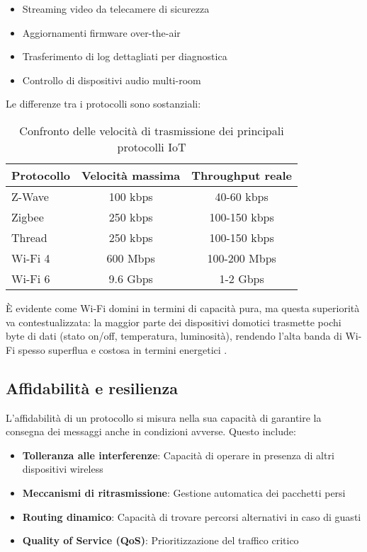 \begin{itemize}
    \item Streaming video da telecamere di sicurezza
    \item Aggiornamenti firmware over-the-air
    \item Trasferimento di log dettagliati per diagnostica
    \item Controllo di dispositivi audio multi-room
\end{itemize}

Le differenze tra i protocolli sono sostanziali:

\begin{table}[h]
\centering
\begin{tabular}{|l|c|c|}
\hline
\textbf{Protocollo} & \textbf{Velocità massima} & \textbf{Throughput reale} \\
\hline
Z-Wave & 100 kbps & 40-60 kbps \\
Zigbee & 250 kbps & 100-150 kbps \\
Thread & 250 kbps & 100-150 kbps \\
Wi-Fi 4 & 600 Mbps & 100-200 Mbps \\
Wi-Fi 6 & 9.6 Gbps & 1-2 Gbps \\
\hline
\end{tabular}
\caption{Confronto delle velocità di trasmissione dei principali protocolli IoT}
\end{table}

È evidente come Wi-Fi domini in termini di capacità pura, ma questa superiorità va contestualizzata: la maggior parte dei dispositivi domotici trasmette pochi byte di dati (stato on/off, temperatura, luminosità), rendendo l'alta banda di Wi-Fi spesso superflua e costosa in termini energetici \cite{WiFiBandwidth}.

\subsection{Affidabilità e resilienza}

L'affidabilità di un protocollo si misura nella sua capacità di garantire la consegna dei messaggi anche in condizioni avverse. Questo include:

\begin{itemize}
    \item \textbf{Tolleranza alle interferenze}: Capacità di operare in presenza di altri dispositivi wireless
    \item \textbf{Meccanismi di ritrasmissione}: Gestione automatica dei pacchetti persi
    \item \textbf{Routing dinamico}: Capacità di trovare percorsi alternativi in caso di guasti
    \item \textbf{Quality of Service (QoS)}: Prioritizzazione del traffico critico
\end{itemize}

